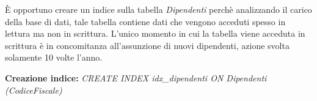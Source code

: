 È opportuno creare un indice sulla tabella \emph{Dipendenti} perchè analizzando il carico della base di dati, tale tabella contiene dati che vengono acceduti spesso in lettura ma non in scrittura. L'unico momento in cui la tabella viene acceduta in scrittura è in concomitanza all'assunzione di nuovi dipendenti, azione svolta solamente 10 volte l'anno.
\begin{flushleft}
	\textbf{{Creazione indice:}} \emph{CREATE INDEX idx\_dipendenti ON Dipendenti (CodiceFiscale)}
\end{flushleft}

